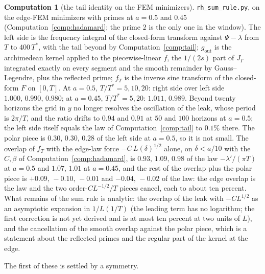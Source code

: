 \documentclass[11pt]{article}
\theoremstyle{definition}
\newtheorem{computation}[theorem]{Computation}
\theoremstyle{remark}
\newcommand{\Tst}{T^{*}}
\begin{document}
\begin{computation}[the tail identity on the FEM minimizers]\label{comp:tailid}
\texttt{rh\_sum\_rule.py}, on the edge-FEM minimizers with primes at $a=0.5$ and $0.45$ (Computation~\ref{comp:hadamard}; the prime $2$ is the only one in the window). The left side is the frequency integral of the closed-form transform against $\Psi-\lambda$ from $T$ to $400\,\Tst$, with the tail beyond by Computation~\ref{comp:tail}; $g_{\mathrm{out}}$ is the archimedean kernel applied to the piecewise-linear $f$, the $1/(2s)$ part of $J_\Gamma$ integrated exactly on every segment and the smooth remainder by Gauss--Legendre, plus the reflected prime; $f_T$ is the inverse sine transform of the closed-form $F$ on $[0,T]$. At $a=0.5$, $T/\Tst=5,10,20$: right side over left side $1.000,\,0.990,\,0.980$; at $a=0.45$, $T/\Tst=5,20$: $1.011,\,0.989$. Beyond twenty horizons the grid in $y$ no longer resolves the oscillation of the leak, whose period is $2\pi/T$, and the ratio drifts to $0.94$ and $0.91$ at $50$ and $100$ horizons at $a=0.5$; the left side itself equals the law of Computation~\ref{comp:tail} to $0.1\%$ there. The polar piece is $0.30,\,0.30,\,0.28$ of the left side at $a=0.5$, so it is not small. The overlap of $f_T$ with the edge-law force $-C\,L(\delta)^{1/2}$ alone, on $\delta<a/10$ with the $C,\beta$ of Computation~\ref{comp:hadamard}, is $0.93,\,1.09,\,0.98$ of the law $-\lambda'/(\pi T)$ at $a=0.5$ and $1.07,\,1.01$ at $a=0.45$, and the rest of the overlap plus the polar piece is $+0.09,\,-0.10,\,-0.01$ and $-0.04,\,-0.02$ of the law: the edge overlap is the law and the two order-$CL^{-1/2}/T$ pieces cancel, each to about ten percent. What remains of the sum rule is analytic: the overlap of the leak with $-CL^{1/2}$ as an asymptotic expansion in $1/L(1/T)$ (the leading term has no logarithm; the first correction is not yet derived and is at most ten percent at two units of $L$), and the cancellation of the smooth overlap against the polar piece, which is a statement about the reflected primes and the regular part of the kernel at the edge.
\end{computation}

The first of these is settled by a symmetry.
\end{document}
